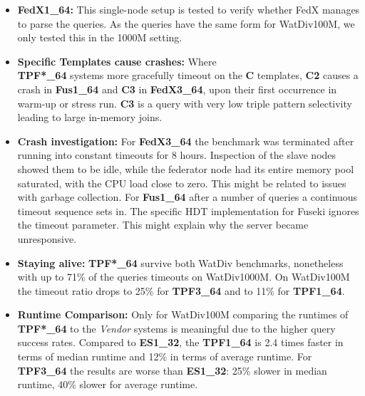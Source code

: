 \begin{itemize}
	\item \textbf{FedX1\_64:} This single-node setup is tested to verify whether FedX manages to parse the queries. As the queries have the same form for WatDiv100M, we only tested this in the 1000M setting.
	\item \textbf{Specific Templates cause crashes:} Where \\ \textbf{TPF*\_64} systems more gracefully timeout on the \textbf{C} templates, \textbf{C2} causes a crash in \textbf{Fus1\_64} and \textbf{C3} in \textbf{FedX3\_64}, upon their first occurrence in warm-up or stress run. \textbf{C3} is a query with very low triple pattern selectivity leading to large in-memory joins.
	\item \textbf{Crash investigation:} For \textbf{FedX3\_64} the benchmark was terminated after running into constant timeouts for 8 hours. Inspection of the slave nodes showed them to be idle, while the federator node had its entire memory pool saturated, with the CPU load close to zero. This might be related to issues with garbage collection.
	For \textbf{Fus1\_64} after a number of queries a continuous timeout sequence sets in. The specific HDT implementation for Fuseki ignores the timeout parameter. This might explain why the server became unresponsive.
	\item \textbf{Staying alive:} \textbf{TPF*\_64} survive both WatDiv benchmarks, nonetheless with up to 71\% of the queries timeouts on WatDiv1000M. On WatDiv100M the timeout ratio drops to 25\% for \textbf{TPF3\_64} and to 11\% for \textbf{TPF1\_64}.
%
	\item \textbf{Runtime Comparison: } Only for WatDiv100M comparing the runtimes of \textbf{TPF*\_64} to the \emph{Vendor} systems is meaningful due to the higher query success rates. Compared to \textbf{ES1\_32}, the \textbf{TPF1\_64} is 2.4 times faster in terms of median runtime and 12\% in terms of average runtime. For \textbf{TPF3\_64} the results are worse than \textbf{ES1\_32}: 25\% slower in median runtime, 40\% slower for average runtime.
\end{itemize}









